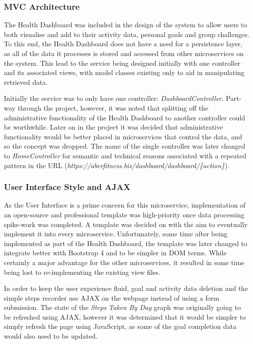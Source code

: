 \subsubsection{MVC Architecture}
\par
The Health Dashboard was included in the design of the system to allow users to both visualise and add to their activity data, personal goals and group challenges. To this end, the Health Dashboard does not have a need for a persistence layer, as all of the data it processes is stored and accessed from other microservices on the system. This lead to the service being designed initially with one controller and its associated views, with model classes existing only to aid in manipulating retrieved data.

\par
Initially the service was to only have one controller: \textit{DashboardController}. Part-way through the project, however, it was noted that splitting off the administrative functionality of the Health Dashboard to another controller could be worthwhile. Later on in the project it was decided that administrative functionality would be better placed in microservices that control the data, and so the concept was dropped. The name of the single controller was later changed to \textit{HomeController} for semantic and technical reasons associated with a repeated pattern in the URL (\textit{https://aberfitness.biz/dashboard/dashboard/\{action\}}).

\subsubsection{User Interface Style and AJAX}
\par
As the User Interface is a prime concern for this microservice, implementation of an open-source and professional template was high-priority once data processing spike-work was completed. A template was decided on with the aim to eventually implement it into every microservice. Unfortunately, some time after being implemented as part of the Health Dashboard, the template was later changed to integrate better with Bootstrap 4 and to be simpler in DOM terms. While certainly a major advantage for the other microservices, it resulted in some time being lost to re-implementing the existing view files.

\par
In order to keep the user experience fluid, goal and activity data deletion and the simple steps recorder use AJAX on the webpage instead of using a form submission. The state of the \textit{Steps Taken By Day} graph was originally going to be refreshed using AJAX, however it was determined that it would be simpler to simply refresh the page using JavaScript, as some of the goal completion data would also need to be updated.

